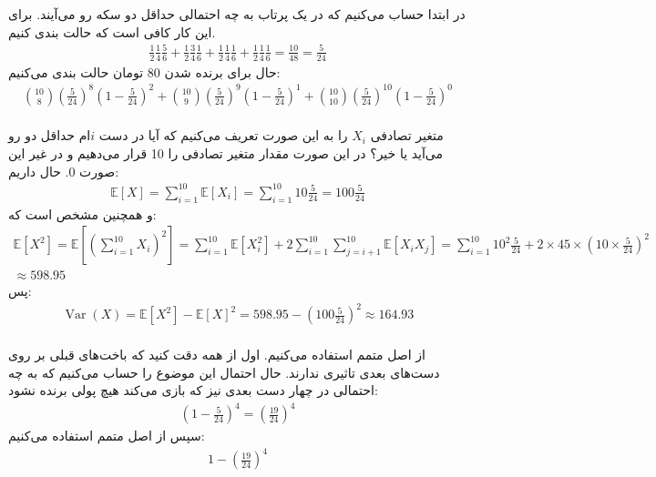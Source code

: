 \\
\\
در ابتدا حساب می‌کنیم که در یک پرتاب به چه احتمالی حداقل دو سکه رو می‌آیند. برای این کار کافی است
که حالت بندی کنیم.
\begin{gather*}
    \frac{1}{2} \frac{1}{4} \frac{5}{6} + \frac{1}{2} \frac{3}{4} \frac{1}{6} + \frac{1}{2} \frac{1}{4} \frac{1}{6} + \frac{1}{2} \frac{1}{4} \frac{1}{6}
    = \frac{10}{48} = \frac{5}{24}
\end{gather*}
حال برای برنده شدن 80 تومان حالت بندی می‌کنیم:
\begin{gather*}
    {10 \choose 8} (\frac{5}{24})^8 (1-\frac{5}{24})^2 + {10 \choose 9} (\frac{5}{24})^9 (1-\frac{5}{24})^1 + {10 \choose 10} (\frac{5}{24})^{10} (1-\frac{5}{24})^0
\end{gather*}
\\
متغیر تصادفی
$X_i$
را به این صورت تعریف می‌کنیم که آیا در دست
$i$ام
حداقل دو رو می‌آید یا خیر؟ در این صورت مقدار متغیر تصادفی را 10 قرار می‌دهیم و در غیر این صورت 0.
حال داریم:
\begin{gather*}
    \mathbb{E} [X] = \sum_{i=1}^{10} \mathbb{E} [X_i] = \sum_{i=1}^{10} 10 \frac{5}{24} = 100 \frac{5}{24}
\end{gather*}
و همچنین مشخص است که:
\begin{gather*}
    \mathbb{E} [X^2] = \mathbb{E} [(\sum_{i=1}^{10} X_i)^2] = \sum_{i=1}^{10} \mathbb{E} [X_i^2] + 2 \sum_{i=1}^{10} \sum_{j = i + 1}^{10} \mathbb{E} [ X_i X_j ] 
    = \sum_{i=1}^{10} 10^2 \frac{5}{24} + 2 \times 45 \times (10 \times \frac{5}{24}) ^2\\
    \approx 598.95
\end{gather*}
پس:
\begin{gather*}
    \operatorname{Var}(X) = \mathbb{E} [X^2] - \mathbb{E} [X]^2 = 598.95 - (100 \frac{5}{24})^2 \approx 164.93
\end{gather*}
\\
از اصل متمم استفاده می‌کنیم. اول از همه دقت کنید که باخت‌های قبلی بر روی دست‌های بعدی تاثیری ندارند.
حال احتمال این موضوع را حساب می‌کنیم که به چه احتمالی در چهار دست بعدی نیز که بازی می‌کند هیچ پولی برنده نشود:
\begin{gather*}
    (1 - \frac{5}{24})^4 = (\frac{19}{24})^4
\end{gather*}
سپس از اصل متمم استفاده می‌کنیم:
\begin{gather*}
    1 - (\frac{19}{24})^4
\end{gather*}
